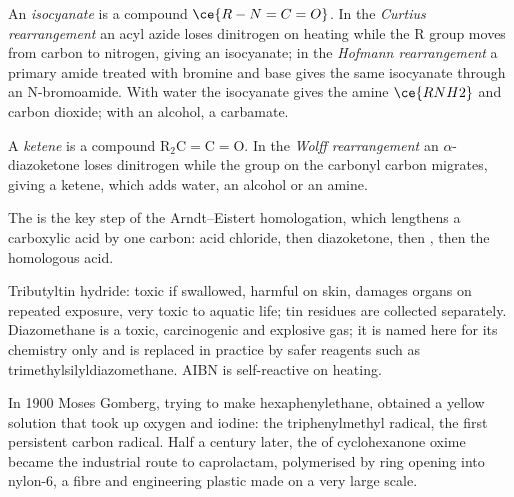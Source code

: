 \begin{definition}\label{def:b3:radicals-carbenes:curtius}
An \emph{isocyanate} is a compound $\ce{R-N=C=O}$. In the \emph{Curtius rearrangement}
 an acyl azide loses dinitrogen on
heating while the R group moves from carbon to nitrogen, giving an isocyanate;
in the \emph{Hofmann rearrangement} a primary amide
treated with bromine and base gives the same isocyanate through an
N-bromoamide. With water the isocyanate gives the amine $\ce{RNH2}$ and carbon
dioxide; with an alcohol, a carbamate.
\end{definition}

\begin{definition}\label{def:b3:radicals-carbenes:wolff}
A \emph{ketene} is a compound $\mathrm{R_2C{=}C{=}O}$. In the \emph{Wolff rearrangement}
 an $\alpha$-diazoketone loses dinitrogen
while the group on the carbonyl carbon migrates, giving a ketene, which adds
water, an alcohol or an amine.
\end{definition}

The  is the key step of the Arndt--Eistert homologation,
which lengthens a carboxylic acid by one carbon: acid chloride, then
diazoketone, then , then the homologous acid.

\begin{safety}{}
Tributyltin hydride: toxic if swallowed, harmful on skin, damages organs on
repeated exposure, very toxic to aquatic life; tin residues are collected
separately. Diazomethane is a toxic, carcinogenic and explosive gas; it is
named here for its chemistry only and is replaced in practice by safer reagents
such as trimethylsilyldiazomethane. AIBN is self-reactive on heating.
\end{safety}

\begin{history}
In 1900 Moses Gomberg, trying to make hexaphenylethane, obtained a yellow
solution that took up oxygen and iodine: the triphenylmethyl radical, the first
persistent carbon radical. Half a century later, the  of
cyclohexanone oxime became the industrial route to caprolactam, polymerised by
ring opening into nylon-6, a fibre and engineering plastic made on a very large
scale.
\end{history}

